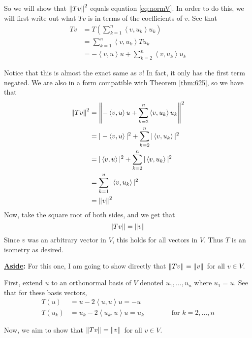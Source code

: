 \documentclass[answers]{exam}
\newcommand{\ip}[1]{\left\langle#1\right\rangle}
\begin{document}
\begin{questions}
\begin{parts}
\begin{solution}
            So we will show that $\left\|Tv\right\|_{}^2$ equals equation \eqref{eq:normV}. In order to do this,
            we will first write out what $Tv$ is in terms of the coefficients of $v$. See that
            \begin{align*}
                Tv &= T\left(\sum_{k=1}^n \ip{v,u_k}u_k\right) \\
                &= \sum_{k=1}^n \ip{v,u_k}Tu_k \\
                &= -\ip{v,u}u + \sum_{k=2}^n \ip{v,u_k}u_k
            \end{align*}

            Notice that this is almost the exact same as $v$! In fact, it only has the first term negated. We are
            also in a form compatible with Theorem \ref{thm:625}, so we have that 
            \begin{align*}
                \norm{Tv}{}^2 &= \norm{-\ip{v,u}u + \sum_{k=2}^n \ip{v,u_k}u_k}{}^2 \\
                &= |-\ip{v,u}|^2 + \sum_{k=2}^n |\ip{v,u_k}|^2 \\
                &= |\ip{v,u}|^2 + \sum_{k=2}^n |\ip{v,u_k}|^2 \\
                &= \sum_{k=1}^n |\ip{v,u_k}|^2 \\
                &= \norm{v}{}^2
            \end{align*}
            Now, take the square root of both sides, and we get that
            \[
                \left\|Tv\right\|_{} = \left\|v\right\|_{}
            \]
            Since $v$ was an arbitrary vector in $V$, this holds for all vectors in $V$. Thus $T$ is an isometry
            as desired.


            \textbf{\underline{Aside}:} For this one, I am going to show directly that 
            $\left\|Tv\right\|_{} = \left\|v\right\|_{}$ for all $v\in V$.

            First, extend $u$ to an orthonormal basis of $V$ denoted $u_1,\dots,u_n$ where $u_1 = u$. See that
            for these basis vectors, 
            \begin{align*}
                T(u) &= u - 2\ip{u,u}u = -u \\
                T(u_k) &= u_k - 2\ip{u_k,u}u = u_k \qquad\qquad \text{for }k=2,\dots,n
            \end{align*}

            Now, we aim to show that $\left\|Tv\right\|_{} = \left\|v\right\|_{}$ for all $v\in V$.


\end{solution}
\end{parts}
\end{questions}
\end{document}
